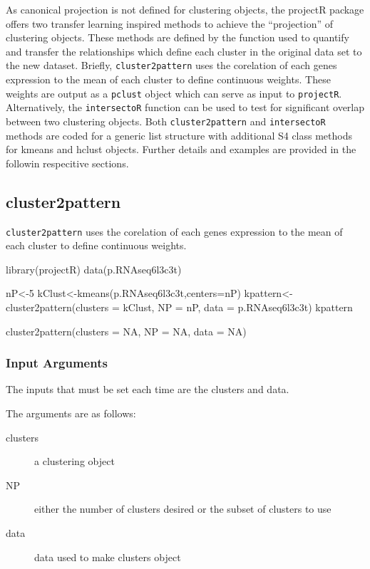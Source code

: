 \documentclass[]{article}
\renewenvironment{verbatim}{\color{codecolor}\begin{myshaded}\begin{oldverbatim}}{\end{oldverbatim}\end{myshaded}}
\begin{document}
As canonical projection is not defined for clustering objects, the projectR package offers two transfer learning inspired methods to achieve the ``projection'' of clustering objects. These methods are defined by the function used to quantify and transfer the relationships which define each cluster in the original data set to the new dataset. Briefly, \texttt{cluster2pattern} uses the corelation of each genes expression to the mean of each cluster to define continuous weights. These weights are output as a \texttt{pclust} object which can serve as input to \texttt{projectR}. Alternatively, the \texttt{intersectoR} function can be used to test for significant overlap between two clustering objects. Both \texttt{cluster2pattern} and \texttt{intersectoR} methods are coded for a generic list structure with additional S4 class methods for kmeans and hclust objects. Further details and examples are provided in the followin respecitive sections.

\hypertarget{cluster2pattern}{%
\subsection{cluster2pattern}\label{cluster2pattern}}

\texttt{cluster2pattern} uses the corelation of each genes expression to the mean of each cluster to define continuous weights.

\begin{verbatim}
library(projectR)
data(p.RNAseq6l3c3t)


nP<-5
kClust<-kmeans(p.RNAseq6l3c3t,centers=nP)
kpattern<-cluster2pattern(clusters = kClust, NP = nP, data = p.RNAseq6l3c3t)
kpattern

cluster2pattern(clusters = NA, NP = NA, data = NA)
\end{verbatim}

\hypertarget{input-arguments-2}{%
\subsubsection{Input Arguments}\label{input-arguments-2}}

The inputs that must be set each time are the clusters and data.

The arguments are as follows:

\begin{description}
\item[clusters]{a clustering object}
\item[NP]{either the number of clusters desired or the subset of clusters to use}
\item[data]{data used to make clusters object}
\end{description}
\end{document}
